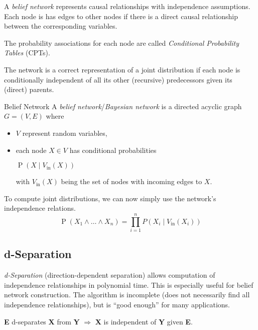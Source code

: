 \documentclass[english]{panikzettel}
\begin{document}
\begin{halfboxl}
A \emph{belief network} represents causal relationships with independence assumptions.
Each node is has edges to other nodes if there is a direct causal relationship between the corresponding variables.

The probability associations for each node are called \emph{Conditional Probability Tables} (CPTs).

The network is a correct representation of a joint distribution if each node is conditionally independent of all its other (recursive) predecessors given its (direct) parents.
\end{halfboxl}%
\begin{halfboxr}
\vspace{-\baselineskip}
\begin{defi}{Belief Network}
A \emph{belief network}/\emph{Bayesian network} is a directed acyclic graph $G = (V,E)$ where
\begin{itemize}
    \item $V$ represent random variables,
    \item each node $X \in V$ has conditional probabilities
        \begin{tightcenter}
        $\operatorname{P}(X \mid V_\mathrm{in}(X))$
        \end{tightcenter}
        with $V_\mathrm{in}(X)$ being the set of nodes with incoming edges to $X$.
\end{itemize}
\end{defi}
\end{halfboxr}

To compute joint distributions, we can now simply use the network's independence relations.
\[ \operatorname{P}(X_1 \land \ldots \land X_n) = \prod_{i=1}^n P(X_i \mid V_\mathrm{in}(X_i)) \]

\subsection{d-Separation}
\emph{d-Separation} (direction-dependent separation) allows computation of independence relationships in polynomial time.
This is especially useful for belief network construction.
The algorithm is incomplete (does not necessarily find all independence relationships), but is ``good enough'' for many applications.

\begin{center}
\textbf E d-separates \textbf X from \textbf Y $\Rightarrow$ \textbf X is independent of \textbf Y given \textbf E.
\end{center}
\medskip
\end{document}
